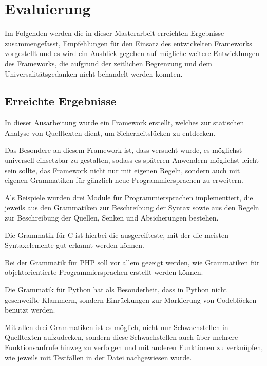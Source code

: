 \chapter{Evaluierung}
    Im Folgenden werden die in dieser Masterarbeit erreichten Ergebnisse zusammengefasst,
    Empfehlungen für den Einsatz des entwickelten Frameworks vorgestellt und
    es wird ein Ausblick gegeben auf mögliche weitere Entwicklungen des Frameworks,
    die aufgrund der zeitlichen Begrenzung und
    dem Universalitätsgedanken nicht behandelt werden konnten.

    \section{Erreichte Ergebnisse}
        In dieser Ausarbeitung wurde ein Framework erstellt,
        welches zur statischen Analyse von Quelltexten dient,
        um Sicherheitslücken zu entdecken.

        Das Besondere an diesem Framework ist,
        dass versucht wurde,
        es möglichst universell einsetzbar zu gestalten,
        sodass es späteren Anwendern möglichst leicht sein sollte,
        das Framework nicht nur mit eigenen Regeln,
        sondern auch mit eigenen Grammatiken für gänzlich neue Programmiersprachen zu erweitern.

        Als Beispiele wurden drei Module für Programmiersprachen implementiert,
        die jeweils aus den Grammatiken zur Beschreibung der Syntax sowie
        aus den Regeln zur Beschreibung der Quellen,
        Senken und
        Absicherungen bestehen.

        Die Grammatik für C ist hierbei die ausgereifteste,
        mit der die meisten Syntaxelemente gut erkannt werden können.

        Bei der Grammatik für
        \gls{PHP} soll vor allem gezeigt werden,
        wie Grammatiken für objektorientierte Programmiersprachen erstellt werden können.

        Die Grammatik für Python hat als Besonderheit,
        dass in Python nicht geschweifte Klammern,
        sondern Einrückungen zur Markierung von Codeblöcken benutzt werden.

        Mit allen drei Grammatiken ist es möglich,
        nicht nur Schwachstellen in Quelltexten aufzudecken,
        sondern diese Schwachstellen auch über mehrere Funktionsaufrufe hinweg zu verfolgen und
        mit anderen Funktionen zu verknüpfen,
        wie jeweils mit Testfällen in der Datei
         nachgewiesen wurde.

